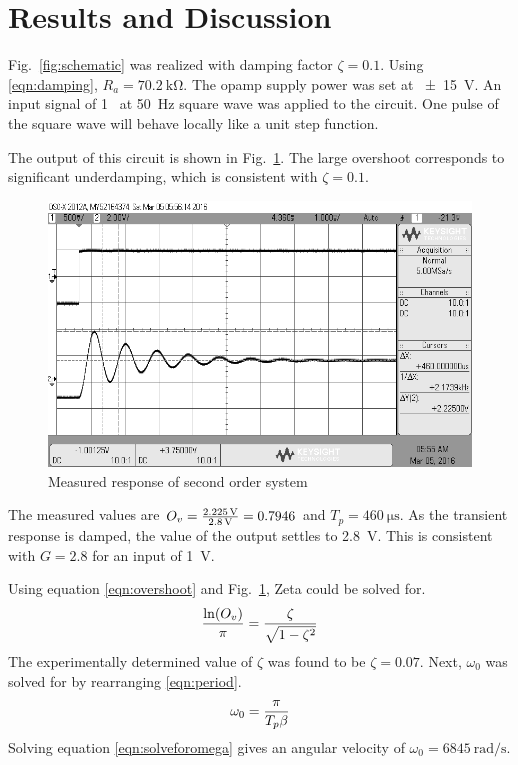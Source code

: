 \section{Results and Discussion}\label{sec:results-and-discussion}
Fig.~\ref{fig:schematic} was realized with damping factor $\zeta = 0.1$.
Using \eqref{eqn:damping}, $R_a = \SI{70.2}{\kilo\ohm}$.
The opamp supply power was set at \SI{+-15}{\volt}.
An input signal of 1~\si{\voltpp} at \SI{50}{\hertz} square wave was applied to the circuit.
One pulse of the square wave will behave locally like a unit step function.

The output of this circuit is shown in Fig.~\ref{fig:overshoot}.
The large overshoot corresponds to significant underdamping, which is consistent with $\zeta = 0.1$.

\pagebreak

\begin{figure}[tbph]
	\centering
	\includegraphics[width=0.7\linewidth]{graphics/overshoot}
	\caption{Measured response of second order system}
	\label{fig:overshoot}
\end{figure}

The measured values are $O_v = {\SI{2.225}{\volt} \over \SI{2.8}{\volt}} = 0.7946$ and $T_p = \SI{460}{\micro\second}$.
As the transient response is damped, the value of the output settles to \SI{2.8}{\volt}.
This is consistent with $G = 2.8$ for an input of \SI{1}{\volt}.

Using equation \eqref{eqn:overshoot} and Fig.~\ref{fig:overshoot}, Zeta could be solved for. 
\begin{equation}\label{eqn:solveforzeta}
	{\ln(O_v) \over \pi} = {\zeta \over \sqrt{1 - \zeta^2}}
\end{equation}
The experimentally determined value of $\zeta$ was found to be $\zeta = 0.07$.
Next, $\omega_0$ was solved for by rearranging \eqref{eqn:period}.
\begin{equation}\label{eqn:solveforomega}
	\omega_0 = { \pi \over T_p\beta }
\end{equation} 
Solving equation \eqref{eqn:solveforomega} gives an angular velocity of $\omega_0 = 6845~\si{\radian\per\second}$.

